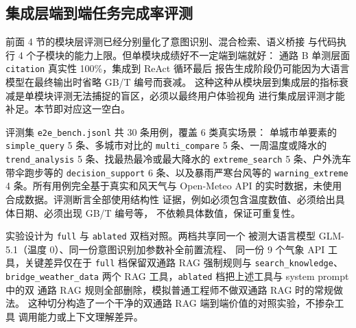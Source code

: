 ﻿%

\subsection{集成层端到端任务完成率评测}
\label{sec:e2e-eval}

前面 4 节的模块层评测已经分别量化了意图识别、混合检索、语义桥接
与代码执行 4 个子模块的能力上限。但单模块成绩好不一定端到端就好：
通路 B 单测层面 \texttt{citation} 真实性 100\%，集成到 ReAct 循环最后
报告生成阶段仍可能因为大语言模型在最终输出时省略 GB/T 编号而衰减。
这种这种从模块层到集成层的指标衰减是单模块评测无法捕捉的盲区，必须以最终用户体验视角
进行集成层评测才能补足。本节即对应这一空白。

评测集 \texttt{e2e\_\bk{}bench.\bk{}jsonl} 共 30 条用例，覆盖 6 类真实场景：
单城市单要素的 \texttt{simple\_\bk{}query} 5 条、多城市对比的
\texttt{multi\_\bk{}compare} 5 条、一周温度或降水的 \texttt{trend\_\bk{}analysis}
5 条、找最热最冷或最大降水的 \texttt{extreme\_\bk{}search} 5 条、户外洗车
带伞跑步等的 \texttt{decision\_\bk{}support} 6 条、以及暴雨严寒台风等的
\texttt{warning\_\bk{}extreme} 4 条。所有用例完全基于真实和风天气与
Open-Meteo API 的实时数据，未使用合成数据。评测断言全部使用结构性
证据，例如必须包含温度数值、必须给出具体日期、必须出现 GB/T 编号等，
不依赖具体数值，保证可重复性。

实验设计为 \texttt{full} 与 \texttt{ablated} 双档对照。两档共享同一个
被测大语言模型 GLM-5.1（温度 0）、同一份意图识别加参数补全前置流程、
同一份 9 个气象 API 工具，关键差异仅在于 \texttt{full} 档保留双通路
RAG 强制规则与 \texttt{search\_\bk{}knowledge}、\texttt{bridge\_\bk{}weather\_\bk{}data}
两个 RAG 工具，\texttt{ablated} 档把上述工具与 system prompt 中的双
通路 RAG 规则全部删除，模拟普通工程师不做双通路 RAG 时的常规做法。
这种切分构造了一个干净的双通路 RAG 端到端价值的对照实验，不掺杂工具
调用能力或上下文理解差异。

